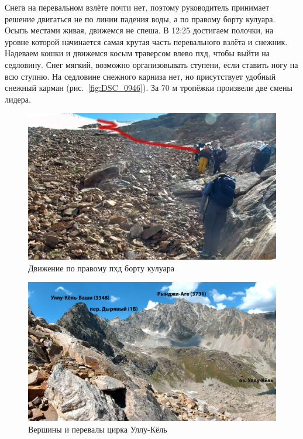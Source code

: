 Снега на перевальном взлёте почти нет, поэтому руководитель принимает решение двигаться не по линии падения воды, а по правому борту кулуара. Осыпь местами живая, движемся не спеша. В 12:25 достигаем полочки, на уровне которой начинается самая крутая часть перевального взлёта и снежник. Надеваем кошки и движемся косым траверсом влево пхд, чтобы выйти на седловину. Снег мягкий, возможно организовывать ступени, если ставить ногу на всю ступню. На седловине снежного карниза нет, но присутствует удобный снежный карман (рис.~\ref{fig:DSC_0946}). За 70 м тропёжки произвели две смены лидера.

\begin{figure}[h!]
	\centering
	\includegraphics[width=0.7\linewidth]{../pics/20aug3.jpg}
	\caption{Движение по правому пхд борту кулуара}
	\label{fig:20aug3.jpg}
\end{figure}

\begin{figure}[h!]
	\centering
	\includegraphics[width=0.7\linewidth]{../pics/20aug4.jpg}
	\caption{Вершины и перевалы цирка Уллу-Кёль}
	\label{fig:20aug4.jpg}
\end{figure}




